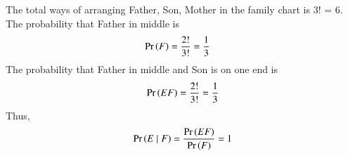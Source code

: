 		The total ways of arranging Father, Son, Mother in the family chart is 3! = 6.
The probability that Father in middle is
\begin{align}
\Pr\left(F\right) &= \frac{2!}{3!}
= \frac{1}{3}
\end{align}
The probability that Father in middle and Son is on one end is
\begin{align}
\Pr\left(EF\right) = \frac{2!}{3!}
= \frac{1}{3}
\end{align}
	Thus,	
\begin{align}
\Pr\left(E \mid F\right)=\frac{\Pr\left(EF\right)}{\Pr\left(F\right)} 
= 1
\end{align}
